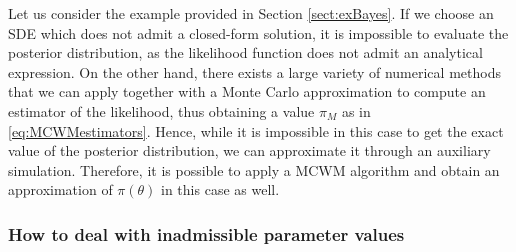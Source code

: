 Let us consider the example provided in Section \ref{sect:exBayes}. If we choose an SDE which does not admit a closed-form solution, it is impossible to evaluate the posterior distribution, as the likelihood function does not admit an analytical expression. On the other hand, there exists a large variety of numerical methods \cite{KPS94} that we can apply together with a Monte Carlo approximation to compute an estimator of the likelihood, thus obtaining a value $\pi_M$ as in \eqref{eq:MCWMestimators}. Hence, while it is impossible in this case to get the exact value of the posterior distribution, we can approximate it through an auxiliary simulation. Therefore, it is possible to apply a MCWM algorithm and obtain an approximation of $\pi(\theta)$ in this case as well.

\subsubsection{How to deal with inadmissible parameter values}

